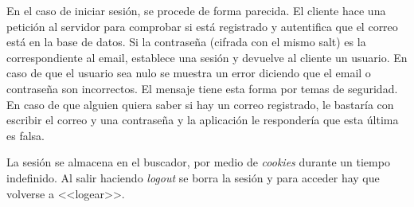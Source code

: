 En el caso de iniciar sesión, se procede de forma parecida. El cliente hace una petición al servidor para comprobar si está registrado y autentifica que el correo está en la base de datos. Si la contraseña (cifrada con el mismo salt) es la correspondiente al email, establece una sesión y devuelve al cliente un usuario. En caso de que el usuario sea nulo se muestra un error diciendo que el email o contraseña son incorrectos. El mensaje tiene esta forma por temas de seguridad. En caso de que alguien quiera saber si hay un correo registrado, le bastaría con escribir el correo y una contraseña y la aplicación le respondería que esta última es falsa.

La sesión se almacena en el buscador, por medio de \emph{cookies} durante un tiempo indefinido. Al salir haciendo \emph{logout} se borra la sesión y para acceder hay que volverse a <<logear>>.
